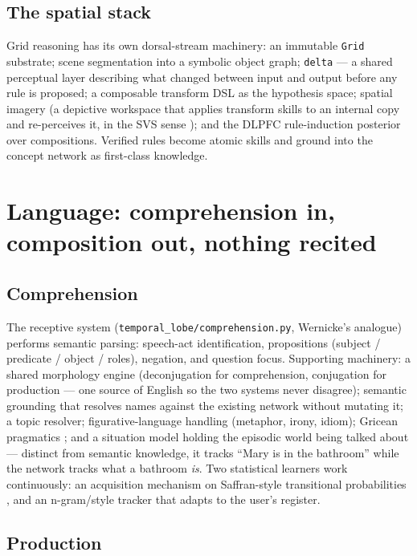 \documentclass[11pt]{article}
\newcommand{\code}[1]{\texttt{\small #1}}
\begin{document}
\subsection{The spatial stack}

Grid reasoning has its own dorsal-stream machinery: an immutable
\code{Grid} substrate; scene segmentation into a symbolic object graph;
\code{delta} --- a shared perceptual layer describing what changed
between input and output before any rule is proposed; a composable
transform DSL as the hypothesis space; spatial imagery (a depictive
workspace that applies transform skills to an internal copy and
re-perceives it, in the SVS sense \cite{svs}); and the DLPFC rule-induction
posterior over compositions. Verified rules become atomic skills and
ground into the concept network as first-class knowledge.

\section{Language: comprehension in, composition out, nothing recited}

\subsection{Comprehension}

The receptive system (\code{temporal\_lobe/comprehension.py},
Wernicke's analogue) performs semantic parsing: speech-act
identification, propositions (subject / predicate / object / roles),
negation, and question focus. Supporting machinery: a shared
morphology engine (deconjugation for comprehension, conjugation for
production --- one source of English so the two systems never
disagree); semantic grounding that resolves names against the existing
network without mutating it; a topic resolver; figurative-language
handling (metaphor, irony, idiom); Gricean pragmatics \cite{grice}; and a situation
model holding the episodic world being talked about --- distinct from
semantic knowledge, it tracks ``Mary is in the bathroom'' while the
network tracks what a bathroom \emph{is}. Two statistical learners work
continuously: an acquisition mechanism on Saffran-style transitional
probabilities \cite{saffran}, and an n-gram/style tracker that adapts
to the user's
register.

\subsection{Production}
\end{document}
